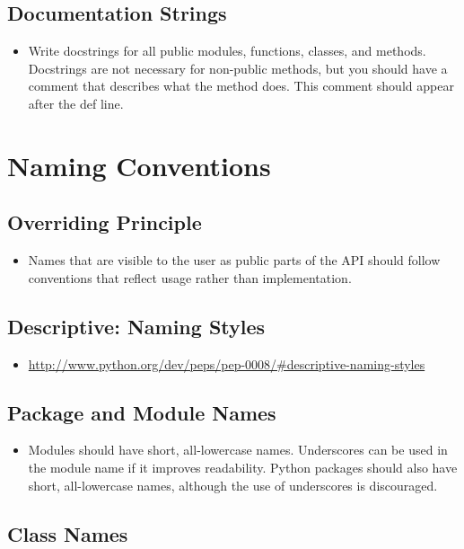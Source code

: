 \documentclass[11pt]{article}
\begin{document}
\subsection{Documentation Strings}
\label{sec-3-7}

\begin{itemize}
\item Write docstrings for all public modules, functions, classes, and methods. Docstrings are not necessary for non-public methods, but you should have a comment that describes what the method does. This comment should appear after the def line.
\end{itemize}
\section{Naming Conventions}
\label{sec-4}
\subsection{Overriding Principle}
\label{sec-4-1}

\begin{itemize}
\item Names that are visible to the user as public parts of the API should follow conventions that reflect usage rather than implementation.
\end{itemize}
\subsection{Descriptive: Naming Styles}
\label{sec-4-2}

\begin{itemize}
\item \href{http://www.python.org/dev/peps/pep-0008/#descriptive-naming-styles}{http://www.python.org/dev/peps/pep-0008/\#descriptive-naming-styles}
\end{itemize}
\subsection{Package and Module Names}
\label{sec-4-3}

\begin{itemize}
\item Modules should have short, all-lowercase names. Underscores can be used in the module name if it improves readability. Python packages should also have short, all-lowercase names, although the use of underscores is discouraged.
\end{itemize}
\subsection{Class Names}
\label{sec-4-4}
\end{document}
